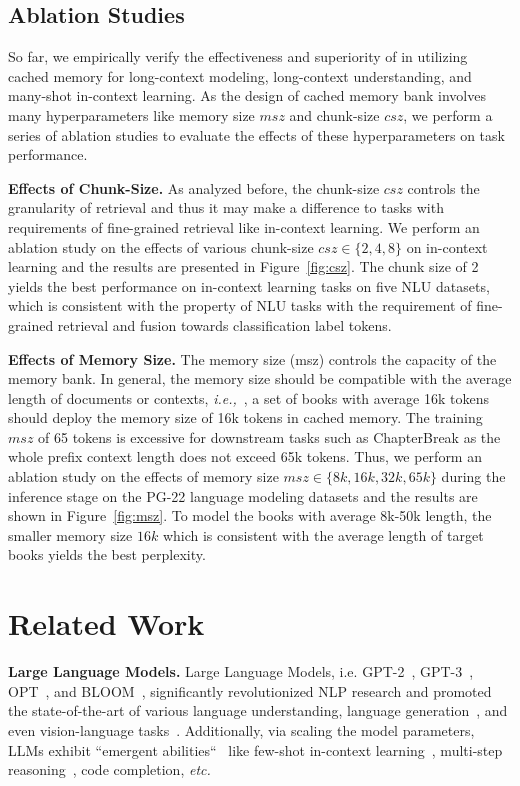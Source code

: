 \subsection{Ablation Studies}

So far, we empirically verify the effectiveness and superiority of \our{} in utilizing cached memory for long-context modeling, long-context understanding, and many-shot in-context learning. As the design of cached memory bank involves many hyperparameters like memory size $msz$ and chunk-size $csz$, we perform a series of ablation studies to evaluate the effects of these hyperparameters on task performance. 

\textbf{Effects of Chunk-Size.} As analyzed before, the chunk-size $csz$ controls the granularity of retrieval and thus it may make a difference to tasks with requirements of fine-grained retrieval like in-context learning. We perform an ablation study on the effects of various chunk-size $csz\in \{2,4,8\}$ on in-context learning and the results are presented in Figure~\ref{fig:csz}. The chunk size of 2 yields the best performance on in-context learning tasks on five NLU datasets, which is consistent with the property of NLU tasks with the requirement of fine-grained retrieval and fusion towards classification label tokens.

\textbf{Effects of Memory Size.} The memory size (msz) controls the capacity of the memory bank. In general, the memory size should be compatible with the average length of documents or contexts, \emph{i.e.,}\ , a set of books with average 16k tokens should deploy the memory size of 16k tokens in cached memory. The training $msz$ of 65 tokens is excessive for downstream tasks such as ChapterBreak as the whole prefix context length does not exceed 65k tokens. Thus, we perform an ablation study on the effects of memory size $msz\in\{8k,16k,32k,65k\}$ during the inference stage on the PG-22 language modeling datasets and the results are shown in Figure~\ref{fig:msz}. To model the books with average 8k-50k length, the smaller memory size $16k$ which is consistent with the average length of target books yields the best perplexity.

\section{Related Work}
\label{sec:related}

\textbf{Large Language Models.} Large Language Models, i.e. GPT-2~\citep{gpt2}, GPT-3~\citep{gpt3}, OPT~\citep{zhang2022opt}, and BLOOM~\citep{scao2022bloom}, significantly revolutionized NLP research and promoted the state-of-the-art of various language understanding, language generation~\citep{wang2022task}, and even vision-language tasks~\citep{valm}. Additionally, via scaling the model parameters, LLMs exhibit ``emergent abilities``~\citep{wei2022emergent} like few-shot in-context learning~\citep{gpt3}, multi-step reasoning~\citep{cot}, code completion, \emph{etc.}\ 

